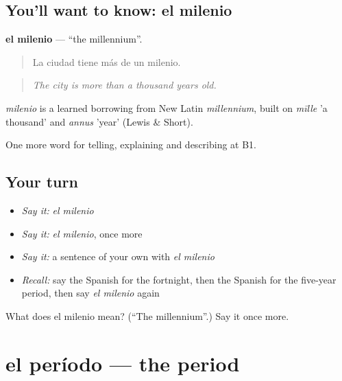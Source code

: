 \subsection*{You'll want to know: el milenio}
\textbf{el milenio} — \textquotedblleft{}the millennium\textquotedblright{}.

\begin{quote}
La ciudad tiene más de un milenio.
\end{quote}

\begin{quote}
\emph{The city is more than a thousand years old.}
\end{quote}

\begin{cousinweb}
\emph{milenio} is a learned borrowing from New Latin \emph{millennium}, built on \emph{mīlle} 'a thousand' and \emph{annus} 'year' (Lewis \& Short).
\end{cousinweb}

\begin{grammarlens}[title={What you've built}]
One more word for telling, explaining and describing at B1.
\end{grammarlens}

\subsection*{Your turn}
\begin{itemize}
\raggedright
  \item \emph{Say it:} \emph{el milenio}
  \item \emph{Say it:} \emph{el milenio}, once more
  \item \emph{Say it:} a sentence of your own with \emph{el milenio}
  \item \emph{Recall:} say the Spanish for the fortnight, then the Spanish for the five-year period, then say \emph{el milenio} again
\end{itemize}

\begin{tcolorbox}[breakable,colback=teal!4,colframe=teal!35!black,title={Before you move on}]
What does el milenio mean? (\textquotedblleft{}The millennium\textquotedblright{}.) Say it once more.
\end{tcolorbox}
\section[el período]{el período — the period}

\label{lesson:ES-C539-periodo}



